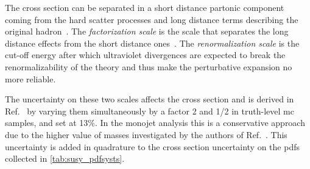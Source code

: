 The cross section can be separated in a short distance partonic component coming
from the hard scatter processes and long distance terms describing the original
hadron~\cite{FactorizationScale}. The \emph{factorization scale} is the scale
that separates the long distance effects from the short distance
ones~\cite{PerturbativeQCDHandbook}. The \emph{renormalization scale} is the
cut-off energy after which ultraviolet divergences are expected to break the
renormalizability of the theory and thus make the perturbative expansion no more
reliable.

The uncertainty on these two scales affects the cross section and is derived in
Ref.~\cite{SquarkGluinoTeam} by varying them simultaneously by a factor 2 and
1/2 in truth-level \gls{mc} samples, and set at 13\%. In the monojet analysis
this is a conservative approach due to the higher value of masses investigated
by the authors of Ref.~\cite{SquarkGluinoTeam}. This uncertainty is added in
quadrature to the cross section uncertainty on the \glspl{pdf} collected in
\cref{tab:susy_pdfsysts}.


